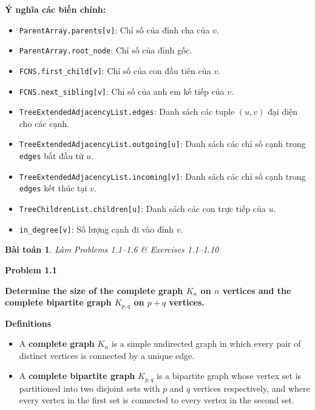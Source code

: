 \documentclass{article}
\newtheorem{baitoan}{Bài toán}
\begin{document}
\textbf{Ý nghĩa các biến chính:}

\begin{itemize}
    \item \texttt{ParentArray.parents[v]}: Chỉ số của đỉnh cha của $v$.
    \item \texttt{ParentArray.root\_node}: Chỉ số của đỉnh gốc.
    \item \texttt{FCNS.first\_child[v]}: Chỉ số của con đầu tiên của $v$.
    \item \texttt{FCNS.next\_sibling[v]}: Chỉ số của anh em kế tiếp của $v$.
    \item \texttt{TreeExtendedAdjacencyList.edges}: Danh sách các tuple $(u,v)$ đại diện cho các cạnh.
    \item \texttt{TreeExtendedAdjacencyList.outgoing[u]}: Danh sách các chỉ số cạnh trong \texttt{edges} bắt đầu từ $u$.
    \item \texttt{TreeExtendedAdjacencyList.incoming[v]}: Danh sách các chỉ số cạnh trong \texttt{edges} kết thúc tại $v$.
    \item \texttt{TreeChildrenList.children[u]}: Danh sách các con trực tiếp của $u$.
    \item \texttt{in\_degree[v]}: Số lượng cạnh đi vào đỉnh $v$.
\end{itemize}


\begin{baitoan}
    Làm Problems 1.1--1.6 \& Exercises 1.1--1.10
\end{baitoan}

\textbf{Problem 1.1}

\textbf{Determine the size of the complete graph $K_n$ on $n$ vertices and the complete bipartite graph $K_{p,q}$ on $p + q$ vertices.}

\textbf{Definitions}

\begin{itemize}
    \item A \textbf{complete graph} $K_n$ is a simple undirected graph in which every pair of distinct vertices is connected by a unique edge.
    \item A \textbf{complete bipartite graph} $K_{p,q}$ is a bipartite graph whose vertex set is partitioned into two disjoint sets with $p$ and $q$ vertices respectively, and where every vertex in the first set is connected to every vertex in the second set.
\end{itemize}
\end{document}
